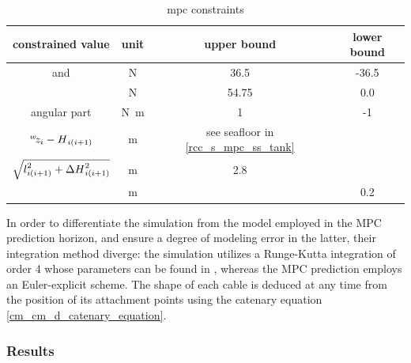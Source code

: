 \begin{table}
	\centering
	\robustify\bfseries
	\caption{\Acl{mpc} constraints}
	\begin{tabular}{@{}ccSS@{}}
		constrained value                                                         & unit             & {upper bound}                              & {lower bound} \\ \midrule
		 and                                & \unit{\newton}   & 36.5                                       & -36.5         \\
		                                                       & \unit{\newton}   & 54.75                                      & 0.0           \\
		angular part                                                 & \unit{\newton\m} & 1                                          & -1            \\
		$\ldcoord{z}{w}{i} - \ldscal{\catH{}}{i(i+1)}$                            & \unit{\m}        & {see seafloor in \cref{rcc_s_mpc_ss_tank}} &               \\
		$\sqrt{{l{}}^{2}_{i(i+1)} + \Delta {\ensuremath{H}{}}^{2}_{i(i+1)}}$ & \unit{\m}        & 2.8                                        &               \\
		                                                  & \unit{\m}        &                                            & 0.2           \\
	\end{tabular}
	\label{rcc_s_mpc_i_constrains_values}
\end{table}

In order to differentiate the simulation from the model employed in the MPC prediction horizon, and
ensure a degree of modeling error in the latter, their integration method diverge: the simulation
utilizes a Runge-Kutta integration of order 4 whose parameters can be found in
\cite{ralstonRungeKuttaMethodsMinimum1962}, whereas the MPC prediction employs an Euler-explicit
scheme. The shape of each cable is deduced at any time from the position of its attachment points
using the catenary equation \cref{cm_cm_d_catenary_equation}.

\subsubsection{Results}
\label{rcc_s_mpc_results}


